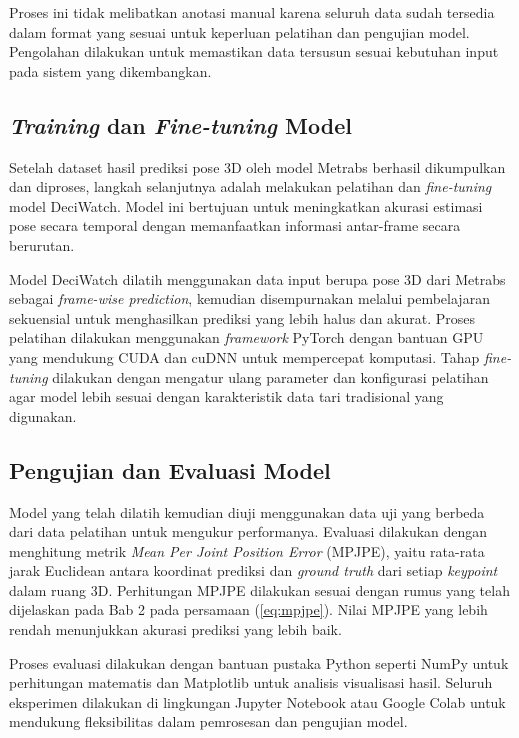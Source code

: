 Proses ini tidak melibatkan anotasi manual karena seluruh data sudah tersedia dalam format yang sesuai untuk keperluan pelatihan dan pengujian model. Pengolahan dilakukan untuk memastikan data tersusun sesuai kebutuhan input pada sistem yang dikembangkan.


\subsection{\textit{Training} dan \textit{Fine-tuning} Model}
Setelah dataset hasil prediksi pose 3D oleh model Metrabs berhasil dikumpulkan dan diproses, langkah selanjutnya adalah melakukan pelatihan dan \textit{fine-tuning} model DeciWatch. Model ini bertujuan untuk meningkatkan akurasi estimasi pose secara temporal dengan memanfaatkan informasi antar-frame secara berurutan. 

Model DeciWatch dilatih menggunakan data input berupa pose 3D dari Metrabs sebagai \textit{frame-wise prediction}, kemudian disempurnakan melalui pembelajaran sekuensial untuk menghasilkan prediksi yang lebih halus dan akurat. Proses pelatihan dilakukan menggunakan \textit{framework} PyTorch dengan bantuan GPU yang mendukung CUDA dan cuDNN untuk mempercepat komputasi. Tahap \textit{fine-tuning} dilakukan dengan mengatur ulang parameter dan konfigurasi pelatihan agar model lebih sesuai dengan karakteristik data tari tradisional yang digunakan.


\subsection{Pengujian dan Evaluasi Model}

Model yang telah dilatih kemudian diuji menggunakan data uji yang berbeda dari data pelatihan untuk mengukur performanya. Evaluasi dilakukan dengan menghitung metrik \textit{Mean Per Joint Position Error} (MPJPE), yaitu rata-rata jarak Euclidean antara koordinat prediksi dan \textit{ground truth} dari setiap \textit{keypoint} dalam ruang 3D. Perhitungan MPJPE dilakukan sesuai dengan rumus yang telah dijelaskan pada Bab 2 pada persamaan (\ref{eq:mpjpe}). Nilai MPJPE yang lebih rendah menunjukkan akurasi prediksi yang lebih baik.

Proses evaluasi dilakukan dengan bantuan pustaka Python seperti NumPy untuk perhitungan matematis dan Matplotlib untuk analisis visualisasi hasil. Seluruh eksperimen dilakukan di lingkungan Jupyter Notebook atau Google Colab untuk mendukung fleksibilitas dalam pemrosesan dan pengujian model.




